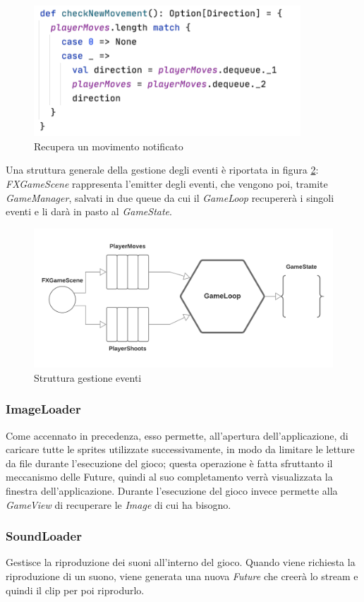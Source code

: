     \begin{figure}[H]
    \centering
      \includegraphics[width=10cm]{res/checkNewMovement.png}
      \caption{Recupera un movimento notificato}
      \label{checknewMovement}
    \end{figure}
    
    Una struttura generale della gestione degli eventi è riportata in figura \ref{gameLoop}: \textit{FXGameScene} rappresenta l'emitter degli eventi, che vengono poi, tramite \textit{GameManager}, salvati in due queue da cui il \textit{GameLoop} recupererà i singoli eventi e li darà in pasto al \textit{GameState}.
    
    \begin{figure}[H]
    \centering
      \includegraphics[width=14cm]{res/event_loop_diagram.png}
      \caption{Struttura gestione eventi}
      \label{gameLoop}
    \end{figure}
    
    \subsubsection{ImageLoader} Come accennato in precedenza, esso permette, all'apertura dell'applicazione, di caricare tutte le sprites utilizzate successivamente, in modo da limitare le letture da file durante l'esecuzione del gioco; questa operazione è fatta sfruttanto il meccanismo delle Future, quindi al suo completamento verrà visualizzata la finestra dell'applicazione. 
    Durante l'esecuzione del gioco invece permette alla \textit{GameView} di recuperare le \textit{Image} di cui ha bisogno.
    
    \subsubsection{SoundLoader} Gestisce la riproduzione dei suoni all'interno del gioco. Quando viene richiesta la riproduzione di un suono, viene generata una nuova \textit{Future} che creerà lo stream e quindi il clip per poi riprodurlo.
